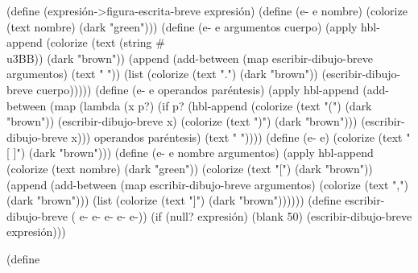 \documentclass[letterpaper, twoside, openright, 11pt]{book}%
\begin{document}
{{{{{{{(define (expresión->figura-escrita-breve expresión)
  (define (e- e nombre)
    (colorize (text nombre) (dark "green")))
  (define (e- e argumentos cuerpo)
    (apply hbl-append
           (colorize (text (string #\\u3BB)) (dark "brown"))
           (append (add-between (map escribir-dibujo-breve argumentos)
                                (text " "))
                   (list (colorize (text ".") (dark "brown"))
                         (escribir-dibujo-breve cuerpo)))))
  (define (e- e operandos paréntesis)
    (apply hbl-append
           (add-between (map (lambda (x p?)
                               (if p?
                                   (hbl-append (colorize (text "(") (dark "brown"))
                                               (escribir-dibujo-breve x)
                                               (colorize (text ")") (dark "brown")))
                                   (escribir-dibujo-breve x)))
                             operandos
                             paréntesis)
                        (text " "))))
  (define (e- e)
    (colorize (text "[ ]") (dark "brown")))
  (define (e- e nombre argumentos)
    (apply hbl-append
           (colorize (text nombre) (dark "green"))
           (colorize (text "[") (dark "brown"))
           (append (add-between (map escribir-dibujo-breve argumentos)
                                (colorize (text ",") (dark "brown")))
                   (list (colorize (text "]") (dark "brown"))))))
  (define escribir-dibujo-breve
    ( e- e- e-
                    e- e-))
  (if (null? expresión)
      (blank 50)
      (escribir-dibujo-breve expresión)))

(define \nwlinkedidentc{código-lienzo%
  (class canvas%
    (inherit refresh refresh-now get-dc get-width get-height)
    (super-new)
    (send this init-auto-scrollbars 1000 1000 0.0 0.0)
    (define expresión null)
    (define expresión-pict (blank 50))
    (define/override (on-paint)
      (define dc (get-dc))
      (draw-pict expresión-pict dc 0 0))
    (define/public (actualizar-expresión e)
      (set! expresión e)
      (set! expresión-pict
            (scale (expresión->código e (inexact->exact
                                         (floor (/ (get-width) 15))))
                   2))
      (send this refresh-now))))

}}}}}}}}
\end{document}
